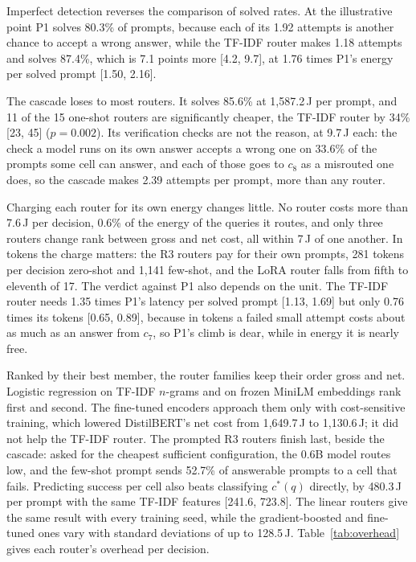 \documentclass[final,5p,times,twocolumn]{elsarticle}
\theoremstyle{plain}
\newcommand{\cstar}{c^{*}}
\begin{document}
Imperfect detection reverses the comparison of solved rates. At the
illustrative point P1 solves 80.3\% of prompts, because each of its 1.92
attempts is another chance to accept a wrong answer, while the TF-IDF router
makes 1.18 attempts and solves 87.4\%, which is 7.1 points more [4.2, 9.7],
at 1.76 times P1's energy per solved prompt [1.50, 2.16].

The cascade loses to most routers. It solves 85.6\% at 1{,}587.2\,J per
prompt, and 11 of the 15 one-shot routers are significantly cheaper, the
TF-IDF router by 34\% [23, 45] ($p = 0.002$). Its verification checks are not
the reason, at 9.7\,J each: the check a model runs on its own answer accepts
a wrong one on 33.6\% of the prompts some cell can answer, and each of those
goes to $c_8$ as a misrouted one does, so the cascade makes 2.39 attempts per
prompt, more than any router.

Charging each router for its own energy changes little. No router costs more
than 7.6\,J per decision, 0.6\% of the energy of the queries it routes, and
only three routers change rank between gross and net cost, all within 7\,J of
one another. In tokens the charge matters: the R3 routers pay for their own
prompts, 281 tokens per decision zero-shot and 1{,}141 few-shot, and the LoRA
router falls from fifth to eleventh of 17. The verdict against P1 also
depends on the unit. The TF-IDF router needs 1.35 times P1's latency per
solved prompt [1.13, 1.69] but only 0.76 times its tokens [0.65, 0.89],
because in tokens a failed small attempt costs about as much as an answer
from $c_7$, so P1's climb is dear, while in energy it is nearly free.

Ranked by their best member, the router families keep their order gross and
net. Logistic regression on TF-IDF $n$-grams and on frozen MiniLM embeddings
rank first and second. The fine-tuned encoders approach them only with
cost-sensitive training, which lowered DistilBERT's net cost from
1{,}649.7\,J to 1{,}130.6\,J; it did not help the TF-IDF router. The prompted
R3 routers finish last, beside the cascade: asked for the cheapest sufficient
configuration, the 0.6B model routes low, and the few-shot prompt sends
52.7\% of answerable prompts to a cell that fails. Predicting success per
cell also beats classifying $\cstar(q)$ directly, by 480.3\,J per prompt with
the same TF-IDF features [241.6, 723.8]. The linear routers give the same
result with every training seed, while the gradient-boosted and fine-tuned
ones vary with standard deviations of up to 128.5\,J. Table~\ref{tab:overhead} gives each router's overhead per decision.
\end{document}

